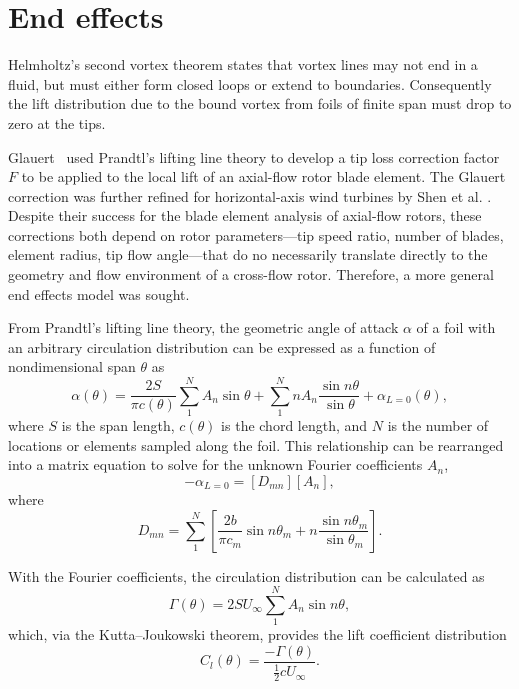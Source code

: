 \documentclass[times]{weauth}
\begin{document}
\section{End effects}

Helmholtz's second vortex theorem states that vortex lines may not end in a
fluid, but must either form closed loops or extend to boundaries. Consequently
the lift distribution due to the bound vortex from foils of finite span must
drop to zero at the tips.

Glauert~\cite{Glauert1935} used Prandtl's lifting line theory \cite{Prandtl1927}
to develop a tip loss correction factor $F$ to be applied to the local lift of
an axial-flow rotor blade element. The Glauert correction was further refined
for horizontal-axis wind turbines by Shen et al. \cite{Shen2005a}. Despite their
success for the blade element analysis of axial-flow rotors, these corrections
both depend on rotor parameters---tip speed ratio, number of blades, element
radius, tip flow angle---that do no necessarily translate directly to the
geometry and flow environment of a cross-flow rotor. Therefore, a more general
end effects model was sought.

From Prandtl's lifting line theory, the geometric angle of attack $\alpha$ of a
foil with an arbitrary circulation distribution can be expressed as a function
of nondimensional span $\theta$ as \cite{Anderson2001}
\begin{equation}
    \alpha (\theta) = \frac{2S}{\pi c (\theta)}
    \sum_1^N A_n \sin \theta
    + \sum_1^N n A_n \frac{\sin n \theta}{\sin \theta}
    + \alpha_{L = 0}(\theta),
    \label{eq:lifting-line}
\end{equation}
where $S$ is the span length, $c(\theta)$ is the chord length, and $N$ is the
number of locations or elements sampled along the foil. This relationship can be
rearranged into a matrix equation to solve for the unknown Fourier coefficients
$A_n$,
\begin{equation}
    [\alpha_m ] - \alpha_{L=0} = [D_{mn}][A_n],
\end{equation}
where
\begin{equation}
    D_{mn} = \sum_1^N \left[ \frac{2b}{\pi c_m} \sin n \theta_m + n \frac{\sin n
        \theta_m}{\sin \theta_m} \right].
\end{equation}

With the Fourier coefficients, the circulation distribution can be calculated as
\begin{equation}
    \Gamma (\theta) = 2SU_\infty \sum_1^N A_n \sin n \theta,
\end{equation}
which, via the Kutta--Joukowski theorem, provides the lift coefficient
distribution
\begin{equation}
    C_l(\theta) = \frac{-\Gamma (\theta)}{\frac{1}{2} c U_\infty}.
\end{equation}
\end{document}
